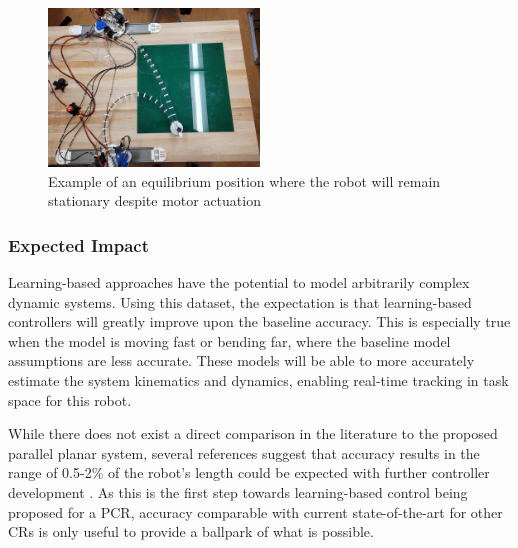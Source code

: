 \begin{figure}[h]
    \centering
    \includegraphics[width=0.5\textwidth]{images/equillibrium_location.jpg}
    \caption{Example of an equilibrium position where the robot will remain stationary despite motor actuation}
    \label{fig:equillibrium_position}
\end{figure}

\subsubsection{Expected Impact}
Learning-based approaches have the potential to model arbitrarily complex dynamic systems. Using this dataset, the expectation is that learning-based controllers will greatly improve upon the baseline accuracy. This is especially true when the model is moving fast or bending far, where the baseline model assumptions are less accurate. These models will be able to more accurately estimate the system kinematics and dynamics, enabling real-time tracking in task space for this robot. 

While there does not exist a direct comparison in the literature to the proposed parallel planar system, several references suggest that accuracy results in the range of 0.5-2\% of the robot's length could be expected with further controller development \cite{grassmann2022a, 7112506, 10.3389/frobt.2021.730330}. As this is the first step towards learning-based control being proposed for a PCR, accuracy comparable with current state-of-the-art for other CRs is only useful to provide a ballpark of what is possible. 